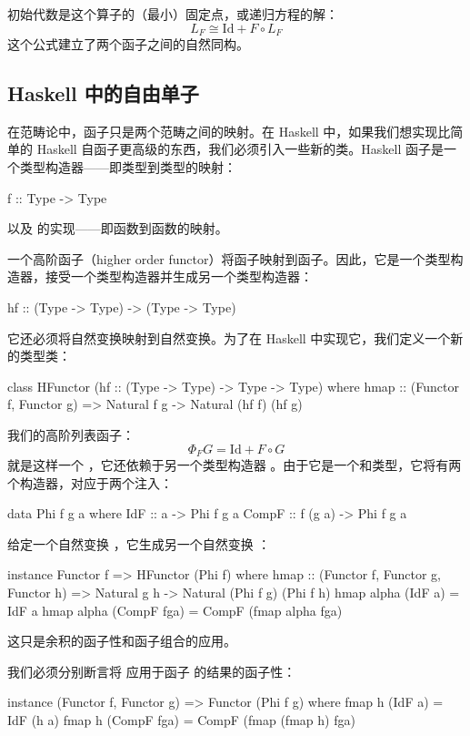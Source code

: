 \documentclass[DaoFP]{subfiles}
\begin{document}
初始代数是这个算子的（最小）固定点，或递归方程的解：
\[ L_F \cong \text{Id} + F \circ L_F \]
这个公式建立了两个函子之间的自然同构。

\subsection{Haskell 中的自由单子}

在范畴论中，函子只是两个范畴之间的映射。在 Haskell 中，如果我们想实现比简单的 Haskell 自函子更高级的东西，我们必须引入一些新的类。Haskell 函子是一个类型构造器——即类型到类型的映射：
\begin{haskell}
f :: Type -> Type
\end{haskell}
以及  的实现——即函数到函数的映射。

一个高阶函子（higher order functor）将函子映射到函子。因此，它是一个类型构造器，接受一个类型构造器并生成另一个类型构造器：
\begin{haskell}
hf :: (Type -> Type) -> (Type -> Type)
\end{haskell}
它还必须将自然变换映射到自然变换。为了在 Haskell 中实现它，我们定义一个新的类型类：
\begin{haskell}
class HFunctor (hf :: (Type -> Type) -> Type -> Type) where
   hmap :: (Functor f, Functor g) => 
       Natural f g -> Natural (hf f) (hf g)
\end{haskell}

我们的高阶列表函子：
\[ \Phi_F G = \text{Id} + F \circ G \]
就是这样一个 ，它还依赖于另一个类型构造器 。由于它是一个和类型，它将有两个构造器，对应于两个注入：
\begin{haskell}
data Phi f g a where
   IdF :: a -> Phi f g a
   CompF :: f (g a) -> Phi f g a
\end{haskell}
给定一个自然变换 ，它生成另一个自然变换 ：
\begin{haskell}
instance Functor f => HFunctor (Phi f) where
   hmap :: (Functor f, Functor g, Functor h) =>
          Natural g h -> Natural (Phi f g) (Phi f h)
   hmap alpha (IdF a) = IdF a
   hmap alpha (CompF fga) = CompF (fmap alpha fga)
\end{haskell}
这只是余积的函子性和函子组合的应用。

我们必须分别断言将  应用于函子  的结果的函子性：
\begin{haskell}
instance (Functor f, Functor g) => Functor (Phi f g) where
   fmap h (IdF a) = IdF (h a)
   fmap h (CompF fga) = CompF (fmap (fmap h) fga)
\end{haskell}
\end{document}

